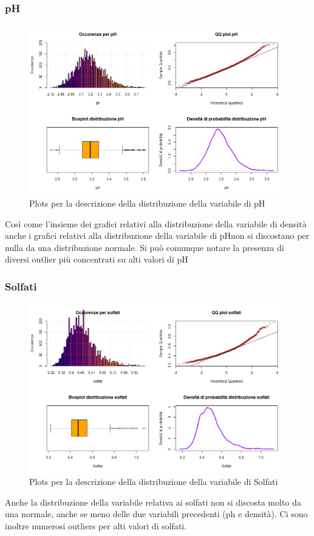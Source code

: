 \documentclass[12pt]{article}
\begin{document}
\subsubsection{pH}
\begin{figure}[!htb]
    \centering
    \includegraphics[width=1\textwidth]{immagini/ph.png}
    \caption{Plots per la descrizione della distribuzione della variabile di pH}
\end{figure}
\FloatBarrier
Così come l'insieme dei grafici relativi alla distribuzione della variabile di densità anche i grafici relativi alla distribuzione della variabile di pHnon si discostano per nulla da una distribuzione normale. Si può comunque notare la presenza di diversi outlier più concentrati su alti valori di pH
\newpage
\subsubsection{Solfati}
\begin{figure}[!htb]
    \centering
    \includegraphics[width=1\textwidth]{immagini/solf.png}
    \caption{Plots per la descrizione della distribuzione della variabile di Solfati}
\end{figure}
\FloatBarrier
Anche la distribuzione della variabile relativa ai solfati non si discosta molto da una normale, anche se meno delle due variabili precedenti (ph e densità). Ci sono inoltre numerosi outliers per alti valori di solfati.
\newpage
\end{document}
